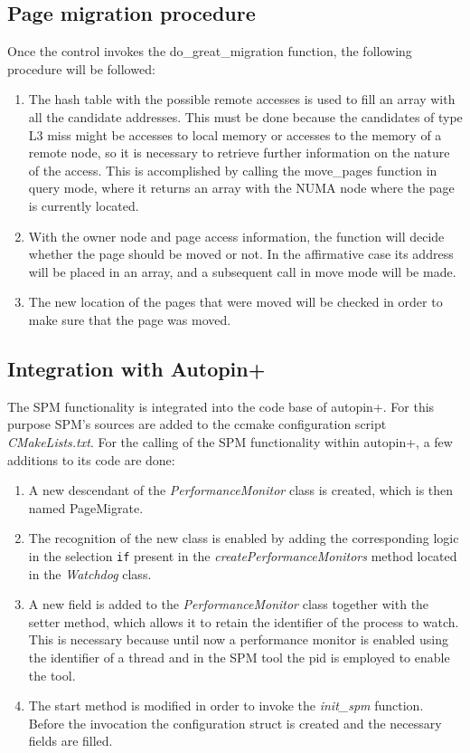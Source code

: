 \subsection{Page migration procedure} \label{subsection:pm-proc}

Once the control invokes the do\_great\_migration function, the following procedure will be followed:

\begin{enumerate}
	\item The hash table with the possible remote accesses is used to fill an array with all the candidate addresses. This must be done because the candidates of type L3 miss might be accesses to local memory or accesses to the memory of a remote node, so it is necessary to retrieve further information on the nature of the access. This is accomplished by calling the move\_pages function in query mode, where it returns an array with the NUMA node where the page is currently located.
	\item With the owner node and page access information, the function will decide whether the page should be moved or not. In the affirmative case its address will be placed in an array, and a subsequent call in move mode will be made.
	\item The new location of the pages that were moved will be checked in order to make sure that the page was moved.
\end{enumerate}

\subsection{Integration with Autopin+}\label{subsection:apinplu-intgr}

The SPM functionality is integrated into the code base of autopin+. For this purpose SPM’s sources are added to the ccmake configuration script \textit{CMakeLists.txt}. For the calling of the SPM functionality within autopin+, a few additions to its code are done:

\begin{enumerate}
	\item A new descendant of the \textit{PerformanceMonitor} class is created, which is then named PageMigrate.
	\item The recognition of the new class is enabled by adding the corresponding logic in the selection \texttt{if} present in the \textit{createPerformanceMonitors} method located in the \textit{Watchdog} class.
	\item A new field is added to the \textit{PerformanceMonitor} class together with the setter method, which allows it to retain the identifier of the process to watch. This is necessary because until now a performance monitor is enabled using the identifier of a thread and in the SPM tool the pid is employed to enable the tool.
	\item The start method is modified in order to invoke the \textit{init\_spm} function. Before the invocation the configuration struct is created and the necessary fields are filled.
\end{enumerate}
